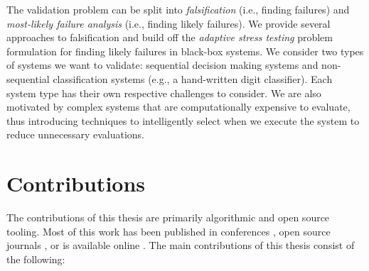 The validation problem can be split into \textit{falsification} (i.e., finding failures) and \textit{most-likely failure analysis} (i.e., finding likely failures). 
We provide several approaches to falsification and build off the \textit{adaptive stress testing} \cite{lee2020adaptive} problem formulation for finding likely failures in black-box systems.
We consider two types of systems we want to validate: sequential decision making systems and non-sequential classification systems (e.g., a hand-written digit classifier).
Each system type has their own respective challenges to consider.
We are also motivated by complex systems that are computationally expensive to evaluate, thus introducing techniques to intelligently select when we execute the system to reduce unnecessary evaluations. 



\section{Contributions} %
\label{sec:contributions}

The contributions of this thesis are primarily algorithmic and open source tooling.
Most of this work has been published in conferences \cite{moss2020adaptive}, open source journals \cite{moss2021pomdpstresstesting}, or is available online \cite{moss2020crossentropy}.
The main contributions of this thesis consist of the following:

